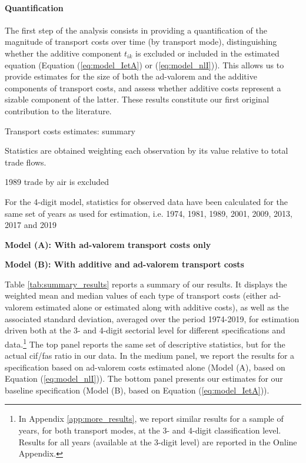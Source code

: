 \documentclass[a4paper,11pt]{article}
\begin{document}
\paragraph{Quantification} The first step of the analysis consists in providing a quantification of the magnitude of transport costs over time (by transport mode), distinguishing whether the additive component $t_{ik}$ is excluded or included in the estimated equation (Equation (\ref{eq:model_IetA}) or (\ref{eq:model_nlI})).
This allows us to provide estimates for the size of both the ad-valorem and the additive components of transport costs, and assess whether additive costs represent a sizable component of the latter.
These results constitute our first original contribution to the literature.
\smallskip

\begin{table}[htbp]
 \centering
\caption{Transport costs estimates: summary} \vspace{5mm} \label{tab:summary_results}

		\begin{tablenotes}
		\scriptsize
		\item Statistics are obtained weighting each observation by its value relative to total trade flows.
		\item 1989 trade by air is excluded
		\item For the  4-digit model, statistics for observed data have been calculated for the same set of years as used for estimation, i.e.
		1974, 1981, 1989, 2001, 2009, 2013, 2017 and 2019
		\item \textbf{Model (A): With ad-valorem transport costs only}
		\item \textbf{Model (B): With additive and ad-valorem transport costs}
	\end{tablenotes}
\end{table}

Table \ref{tab:summary_results} reports a summary of our results.
It displays the weighted mean and median values of each type of transport costs (either ad-valorem estimated alone or estimated along with additive costs), as well as the associated standard deviation, averaged over the period 1974-2019, for estimation driven both at the 3- and 4-digit sectorial level for different specifications and data.\footnote{In Appendix \ref{app:more_results}, we report similar results for a sample of years, for both transport modes, at the 3- and 4-digit classification level. Results for all years (available at the 3-digit level) are reported in the Online Appendix.}
The top panel reports the same set of descriptive statistics, but for the actual cif/fas ratio in our data. In the medium panel, we report the results for a specification based on ad-valorem costs estimated alone (Model (A), based on Equation (\ref{eq:model_nlI})). The bottom panel presents our estimates for our baseline specification (Model (B), based on Equation (\ref{eq:model_IetA})).
\end{document}
